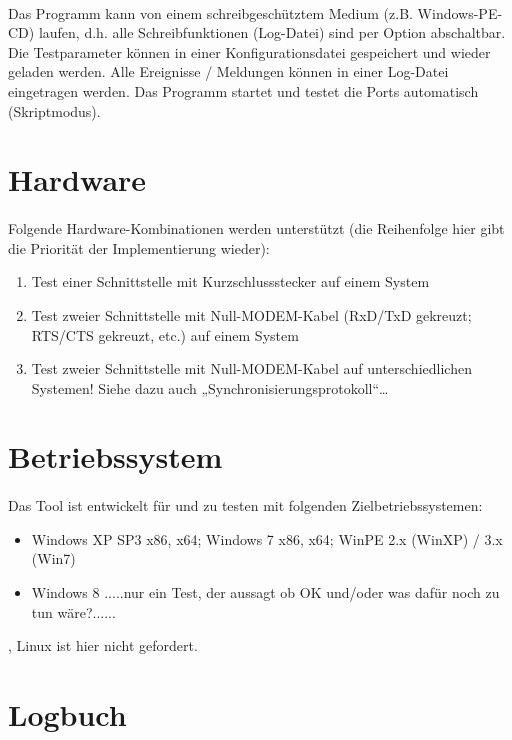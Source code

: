 \paragraph{}
Das Programm kann von einem schreibgeschütztem Medium (z.B. Windows-PE-CD) laufen, d.h. alle Schreibfunktionen (Log-Datei) sind per Option abschaltbar.
Die Testparameter können in einer Konfigurationsdatei gespeichert und wieder geladen werden.
Alle Ereignisse / Meldungen können in einer Log-Datei eingetragen werden.
Das Programm startet und testet die Ports automatisch (Skriptmodus).


\section{Hardware}
\paragraph{}
Folgende Hardware-Kombinationen werden unterstützt (die Reihenfolge hier gibt die Priorität der Implementierung wieder):
\begin{enumerate}
\item Test einer Schnittstelle mit Kurzschlussstecker auf einem System
\item Test zweier Schnittstelle mit Null-MODEM-Kabel (RxD/TxD gekreuzt; RTS/CTS gekreuzt, etc.) auf einem System
\item Test zweier Schnittstelle mit Null-MODEM-Kabel auf unterschiedlichen Systemen! Siehe dazu auch „Synchronisierungsprotokoll“…
\end{enumerate}



\section{Betriebssystem}
\paragraph{}
Das Tool ist entwickelt für und zu testen mit folgenden Zielbetriebssystemen:
\begin{itemize}
\item Windows XP SP3 x86, x64; Windows 7 x86, x64; WinPE 2.x (WinXP) / 3.x (Win7)
\item Windows 8 .....nur ein Test, der aussagt ob OK und/oder was dafür noch zu tun wäre?......
\end{itemize},
Linux ist hier nicht gefordert.

\section{Logbuch}
